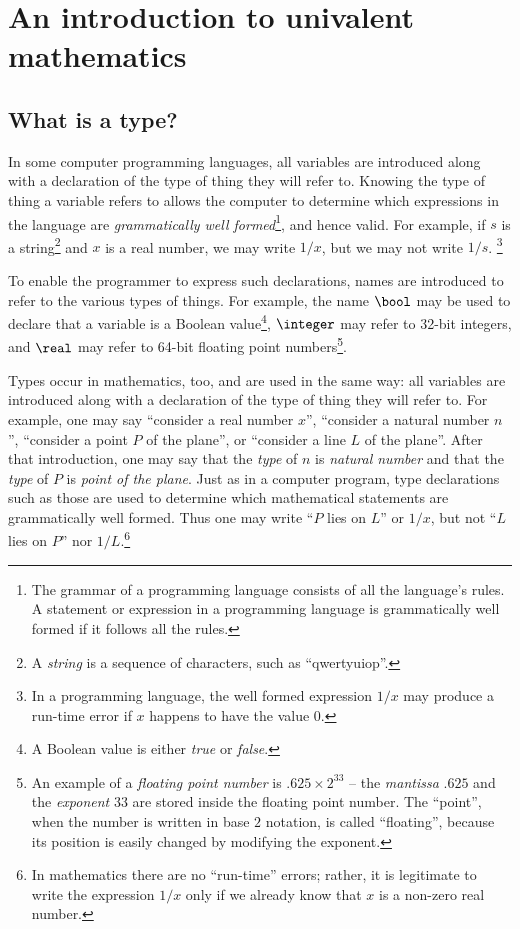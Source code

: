 \chapter{An introduction to univalent mathematics}
\label{ch:univalent-mathematics}

\section{What is a type?}
\label{sec:what-is-a-type}

In some computer programming languages, all variables are introduced along with a declaration of the type of thing they will refer to.  Knowing
the type of thing a variable refers to allows the computer to determine which expressions in the language are \emph{grammatically well
formed}\footnote{The grammar of a programming language consists of all the language's rules.  A statement or expression in a programming
language is grammatically well formed if it follows all the rules.}, and hence valid.  For example, if $s$ is a
string\footnote{A \emph{string} is a sequence of characters, such as ``qwertyuiop''.} and $x$ is a real number, we may write $1/x$, but we may not write $1/s$.%
\footnote{In a programming language, the well formed expression $1/x$ may produce a run-time error if $x$ happens to have the value $0$.}

To enable the programmer to express such declarations, names are introduced to refer to the various types of things.  For example, the name
$\bool$ may be used to declare that a variable is a Boolean value\footnote{A Boolean value is either \emph{true} or \emph{false}.},
  $\integer$ may refer to 32-bit integers, and $\real$ may refer to 64-bit floating point numbers\footnote{An example of a \emph{floating
point number} is $.625 \times 2^{33}$ -- the \emph{mantissa} $.625$ and the \emph{exponent} $33$ are stored inside the floating point number.
The ``point'', when the number is written in base $2$ notation, is called ``floating'', because its position is easily changed by modifying the exponent.}.

Types occur in mathematics, too, and are used in the same way: all variables are introduced along with a declaration of the type of thing they
will refer to. For example, one may say ``consider a real number $x$'', ``consider a natural number $n$'', ``consider a point $P$ of
the plane'', or ``consider a line $L$ of the plane''.  After that introduction, one may say that the \emph{type} of $n$ is \emph{natural number} and
that the \emph{type} of $P$ is \emph{point of the
plane}.  Just as in a computer program, type declarations such as those are used to determine which mathematical statements are grammatically
well formed.  Thus one may write ``$P$ lies on $L$'' or $1/x$, but not ``$L$ lies on $P$'' nor $1/L$.\footnote{In mathematics there are no
``run-time'' errors; rather, it is legitimate to write the expression $1/x$ only if we already know that $x$ is a non-zero real number.}

